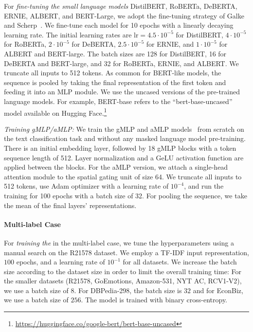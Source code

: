 For \textit{fine-tuning the small language models} 
DistilBERT, RoBERTa, DeBERTA, ERNIE, ALBERT, and BERT-Large, we adopt the fine-tuning strategy of Galke and Scherp~\cite{galkescherp-acl2022}.
We fine-tune each model for 10 epochs with a linearly decaying learning rate.
The initial learning rates are $\mathrm{lr}=4.5\cdot 10^{-5}$ for DistilBERT, $4 \cdot 10^{-5}$ for RoBERTa, $2 \cdot 10^{-5}$ for DeBERTA, $2.5 \cdot 10^{-5}$ for ERNIE, and $1 \cdot 10^{-5}$ for ALBERT and BERT-large. The batch sizes are 128 for DistilBERT, 16 for DeBERTA and BERT-large, and 32 for RoBERTa, ERNIE, and ALBERT. 
We truncate all inputs to 512 tokens. 
As common for BERT-like models, the sequence is pooled by taking the final representation of the first token and feeding it into an MLP module. We use the uncased versions of the pre-trained language models.
For example, BERT-base refers to the ``bert-base-uncased'' model available on Hugging Face.\footnote{\url{https://huggingface.co/google-bert/bert-base-uncased}}

\textit{Training gMLP/aMLP:}
We train the gMLP and aMLP models~\cite{DBLP:journals/corr/abs-2105-08050} from scratch on the text classification task and without any masked language model pre-training. There is an initial embedding layer, followed by 18 gMLP blocks with a token sequence length of 512. Layer normalization and a GeLU activation function are applied between the blocks. For the aMLP version, we attach a single-head attention module to the spatial gating unit of size 64.
We truncate all inputs to 512 tokens, use Adam optimizer with a learning rate of $10^{-4}$, and run the training for 100 epochs with a batch size of 32. For pooling the sequence, we take the mean of the final layers' representations.

\paragraph{Multi-label Case}
For \textit{training the \mlp{}} in the multi-label case, we tune the hyperparameters using a manual search on the R21578 dataset. 
We employ a TF-IDF input representation, $100$ epochs, and a learning rate of $10^{-1}$ for all datasets.  We increase the batch size according to the dataset size in order to limit the overall training time:
For the smaller datasets (R21578, GoEmotions, Amazon-531, NYT AC, RCV1-V2), we use a batch size of 8. 
For DBPedia-298, the batch size is $32$ and for EconBiz, we use a batch size of $256$. 
The model is trained with binary cross-entropy. 

